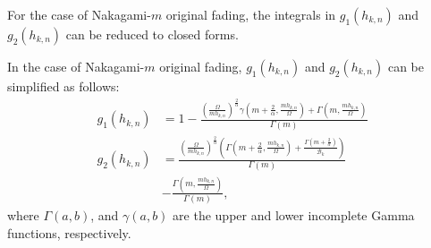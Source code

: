 \documentclass[final]{IEEEtran}
\begin{document}
For the case of Nakagami-$m$ original fading, the integrals in $g_1(h_{k,n})$ and $g_2(h_{k,n})$ can be reduced to closed forms.
\begin{cor}%
In the case of Nakagami-$m$ original fading, $g_1(h_{k,n})$ and $g_2(h_{k,n})$ can be simplified as follows:
\begin{align}
g_1(h_{k,n})&=1-\frac{\left(\frac{\Omega}{mh_{k,n}}\right)^{\frac{2}{\alpha}}\gamma\left(m+\frac{2}{\alpha},\frac{mh_{k,n}}{\Omega}\right)+\Gamma\left(m,\frac{mh_{k,n}}{\Omega}\right)}{\Gamma(m)}\nonumber\\
g_2(h_{k,n})&=\frac{\left(\frac{\Omega}{mh_{k,n}}\right)^{\frac{2}{\alpha}}\left(\Gamma\left(m+\frac{2}{\alpha},\frac{mh_{k,n}}{\Omega}\right)+\frac{\Gamma(m+\frac{2}{\alpha})}{\mathcal{B}_k}\right)}{\Gamma(m)}\nonumber\\
&-\frac{\Gamma\left(m,\frac{mh_{k,n}}{\Omega}\right)}{\Gamma(m)},
\end{align}
where $\Gamma(a,b)$, and $\gamma(a,b)$ are the upper and lower incomplete Gamma functions, respectively.
\end{cor}
\end{document}

